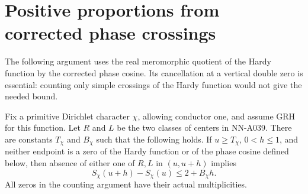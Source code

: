 \section{Positive proportions from corrected phase crossings}
\label{sec:analytic-signed-positive-density}

The following argument uses the real meromorphic quotient of the
Hardy function by the corrected phase cosine. Its cancellation at
a vertical double zero is essential: counting only simple crossings
of the Hardy function would not give the needed bound.

\begin{lemma}
\label{lem:A042-crossing}
Fix a primitive Dirichlet character $\chi$, allowing conductor one,
and assume GRH for this function. Let $R$ and $L$ be the two
classes of centers in NN-A039. There are constants $T_\chi$ and
$B_\chi$ such that the following holds. If $u\ge T_\chi$,
$0<h\le1$, and neither endpoint is a zero of the Hardy function
or of the phase cosine defined below, then absence of either
one of $R,L$ in $(u,u+h)$ implies
\begin{equation}\label{eq:A042-one-sided-increment}
                  S_\chi(u+h)-S_\chi(u)\le2+B_\chi h.
\end{equation}
All zeros in the counting argument have their actual multiplicities.
\end{lemma}

